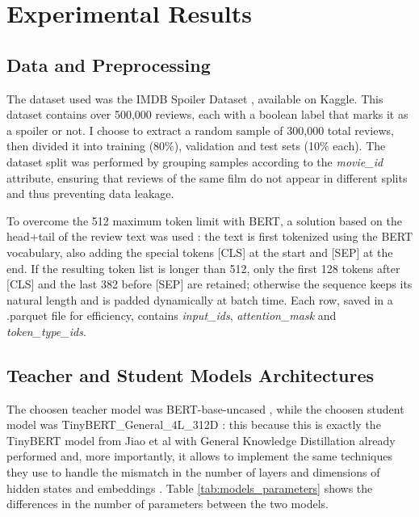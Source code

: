 \documentclass[11pt, a4paper]{article}
\begin{document}
\section{Experimental Results} 
\subsection{Data and Preprocessing}
The dataset used was the IMDB Spoiler Dataset \cite{misra2019imdb}, available on Kaggle. This dataset contains over 500,000 reviews, each with a boolean label that marks it as a spoiler or not. I choose to extract a random sample of 300,000 total reviews, then divided it into training (80\%), validation and test sets (10\% each). The dataset split was performed by grouping samples according to the \textit{movie\_id} attribute, ensuring that reviews of the same film do not appear in different splits and thus preventing data leakage.

To overcome the 512 maximum token limit with BERT, a solution based on the head+tail of the review text was used \cite{sun2020finetuneberttextclassification}: the text is first tokenized using the BERT vocabulary, also adding the special tokens [CLS] at the start and [SEP] at the end. If the resulting token list is longer than 512, only the first 128 tokens after [CLS] and the last 382 before [SEP] are retained; otherwise the sequence keeps its natural length and is padded dynamically at batch time. Each row, saved in a .parquet file for efficiency, contains \textit{input\_ids}, \textit{attention\_mask} and \textit{token\_type\_ids}.
\subsection{Teacher and Student Models Architectures}
The choosen teacher model was BERT-base-uncased \cite{DBLP:journals/corr/abs-1810-04805}, while the choosen student model was TinyBERT\_General\_4L\_312D \cite{jiao2020tinybertdistillingbertnatural}: this because this is exactly the TinyBERT model from Jiao et al with General Knowledge Distillation already performed and, more importantly, it allows to implement the same techniques they use to handle the mismatch in the number of layers and dimensions of hidden states and embeddings \cite{jiao2020tinybertdistillingbertnatural}. Table \ref{tab:models_parameters} shows the differences in the number of parameters between the two models. 
\end{document}
